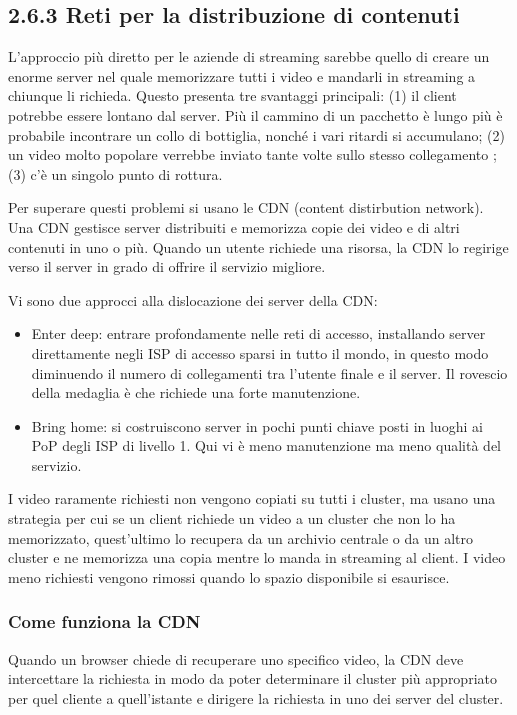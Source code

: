 \documentclass{book}
\begin{document}
\subsection*{2.6.3 Reti per la distribuzione di contenuti}
L'approccio più diretto per le aziende di streaming sarebbe quello di creare un enorme server nel quale memorizzare tutti i video e mandarli in streaming a chiunque li richieda. Questo presenta tre svantaggi principali: (1) il client potrebbe essere lontano dal server. Più il cammino di un pacchetto è lungo più è probabile incontrare un collo di bottiglia, nonché i vari ritardi si accumulano; (2) un video molto popolare verrebbe inviato tante volte sullo stesso collegamento ; (3) c'è un singolo punto di rottura.

Per superare questi problemi si usano le CDN (content distirbution network). Una CDN gestisce server distribuiti e memorizza copie dei video e di altri contenuti in uno o più. Quando un utente richiede una risorsa, la CDN lo regirige verso il server in grado di offrire il servizio migliore.

Vi sono due approcci alla dislocazione dei server della CDN:
\begin{itemize}
	\item Enter deep: entrare profondamente nelle reti di accesso, installando server direttamente negli ISP di accesso sparsi in tutto il mondo, in questo modo diminuendo il numero di collegamenti tra l'utente finale e il server. Il rovescio della medaglia è che richiede una forte manutenzione.
	\item Bring home: si costruiscono server in pochi punti chiave posti in luoghi ai PoP degli ISP di livello 1. Qui vi è meno manutenzione ma meno qualità del servizio.
\end{itemize}

I video raramente richiesti non vengono copiati su tutti i cluster, ma usano una strategia per cui se un client richiede un video a un cluster che non lo ha memorizzato, quest'ultimo lo recupera da un archivio centrale o da un altro cluster e ne memorizza una copia mentre lo manda in streaming al client. I video meno richiesti vengono rimossi quando lo spazio disponibile si esaurisce.

\subsubsection*{Come funziona la CDN}
Quando un browser chiede di recuperare uno specifico video, la CDN deve intercettare la richiesta in modo da poter determinare il cluster più appropriato per quel cliente a quell'istante e dirigere la richiesta in uno dei server del cluster.
\end{document}
